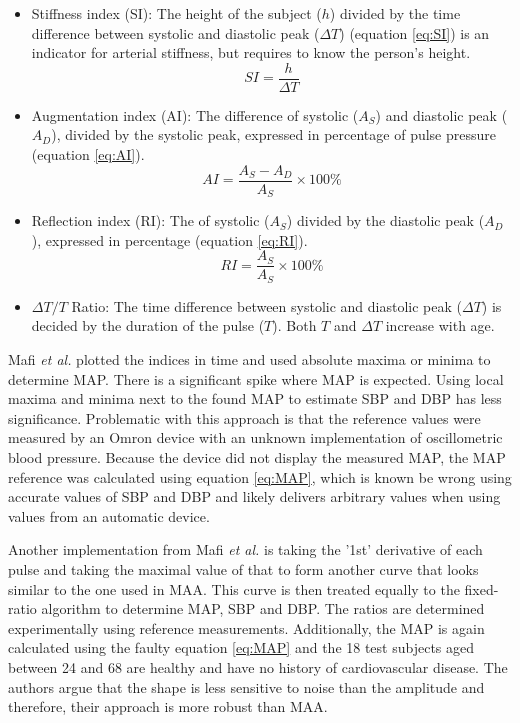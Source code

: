 \begin{itemize}

\item Stiffness index (SI): The height of the subject ($h$) divided by the time difference between systolic and diastolic peak ($\Delta T$) (equation \ref{eq:SI}) is an indicator for arterial stiffness, but requires to know the person's height.
\begin{equation}
\label{eq:SI}
SI=\frac{h}{\Delta T}
\end{equation}

\item Augmentation index (AI): The difference of systolic ($A_S$) and diastolic peak ($A_D$), divided by the systolic peak, expressed in percentage of pulse pressure (equation \ref{eq:AI}).
\begin{equation}
\label{eq:AI}
AI=\frac{A_S-A_D}{A_S}\times100\%
\end{equation}


\item Reflection index (RI): The of systolic ($A_S$) divided by the diastolic peak ($A_D$), expressed in percentage (equation \ref{eq:RI}).
\begin{equation}
\label{eq:RI}
RI=\frac{A_S}{A_S}\times100\%
\end{equation}



\item $\Delta T/T$ Ratio: The time difference between systolic and diastolic peak ($\Delta T$) is decided by the duration of the pulse ($T$). Both $T$ and $\Delta T$ increase with age.

\end{itemize}

Mafi \textit{et al.}\cite{Mafi2011} plotted the indices in time and used absolute maxima or minima to determine MAP. There is a significant spike where MAP is expected. Using local maxima and minima next to the found MAP to estimate SBP and DBP has less significance. Problematic with this approach is that the reference values were measured by an Omron device with an unknown implementation of oscillometric blood pressure. Because the device did not display the measured MAP, the MAP reference was calculated using equation \ref{eq:MAP}, which is known be wrong using accurate values of SBP and DBP and likely delivers arbitrary values when using values from an automatic device.

Another implementation from Mafi \textit{et al.}\cite{Mafi2012} is taking the '1st' derivative of each pulse and taking the maximal value of that to form another curve that looks similar to the one used in MAA. This curve is then treated equally to the fixed-ratio algorithm to determine MAP, SBP and DBP. The ratios are determined experimentally using reference measurements. Additionally, the MAP is again calculated using the faulty equation \ref{eq:MAP} and the 18 test subjects aged between 24 and 68 are healthy and have no history of cardiovascular disease. The authors argue that the shape is less sensitive to noise than the amplitude and therefore, their approach is more robust than MAA.


